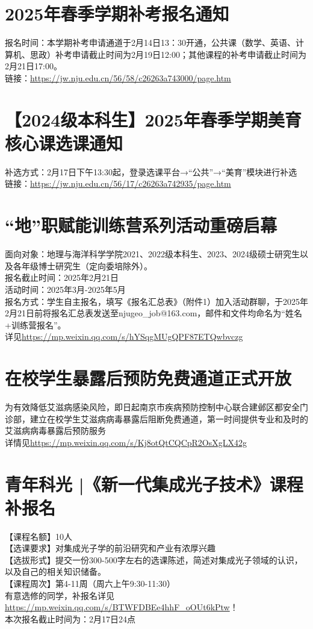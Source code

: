 \documentclass[letterpaper, 12pt]{article}
\begin{document}
\begin{multicols}{2}
\section{2025年春季学期补考报名通知}
报名时间：本学期补考申请通道于2月14日13：30开通，公共课（数学、英语、计算机、思政）补考申请截止时间为2月19日12:00；其他课程的补考申请截止时间为2月21日17:00。\\
链接：\url{https://jw.nju.edu.cn/56/58/c26263a743000/page.htm}\\

\section{【2024级本科生】2025年春季学期美育核心课选课通知}
补选方式：2月17日下午13:30起，登录选课平台→“公共”→“美育”模块进行补选\\
链接：\url{https://jw.nju.edu.cn/56/17/c26263a742935/page.htm}\\

\section{“地”职赋能训练营系列活动重磅启幕}
面向对象：地理与海洋科学学院2021、2022级本科生、2023、2024级硕士研究生以及各年级博士研究生（定向委培除外）。\\
报名截止时间：2025年2月21日\\
活动时间：2025年3月-2025年5月\\
报名方式：学生自主报名，填写《报名汇总表》（附件1）加入活动群聊，于2025年2月21日前将报名汇总表发送至njugeo\_job@163.com，邮件和文件均命名为“姓名+训练营报名”。\\
详见\url{https://mp.weixin.qq.com/s/hYSqgMUgQPF87ETQwbvczg}\\
\section{在校学生暴露后预防免费通道正式开放}
为有效降低艾滋病感染风险，即日起南京市疾病预防控制中心联合建邺区都安全门诊部，建立在校学生艾滋病病毒暴露后阻断免费通道，第一时间提供专业和及时的艾滋病病毒暴露后预防服务\\
详情见\url{https://mp.weixin.qq.com/s/Kj8otQtCQCpR2OsXgLX42g}\\
\section{青年科光 |《新一代集成光子技术》课程补报名}
【课程名额】10人\\
【选课要求】对集成光子学的前沿研究和产业有浓厚兴趣\\
【选拔形式】提交一份300-500字左右的选课陈述，简述对集成光子领域的认识，以及自己的相关知识储备。\\
【课程周次】第4-11周（周六上午9:30-11:30）\\
有意选修的同学，补报名详见\url{https://mp.weixin.qq.com/s/BTWFDBEe4hhF\_oOUt6kPtw}！\\
本次报名截止时间为：2月17日24点\\

\end{multicols}
\end{document}
